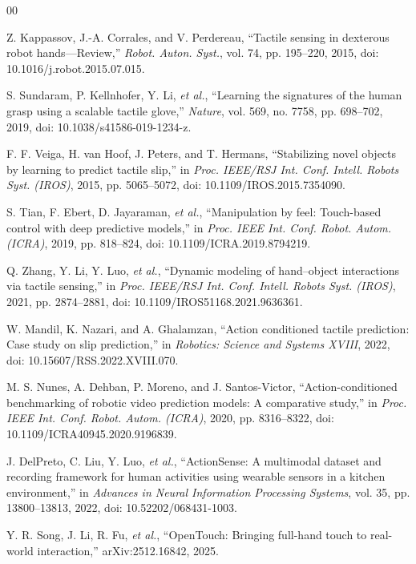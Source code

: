 \documentclass[letterpaper, 10 pt, conference]{ieeeconf}
\begin{document}
\begin{thebibliography}{00}

Z. Kappassov, J.-A. Corrales, and V. Perdereau, ``Tactile sensing in dexterous robot hands---Review,'' \emph{Robot. Auton. Syst.}, vol. 74, pp. 195--220, 2015, doi: 10.1016/j.robot.2015.07.015.

S. Sundaram, P. Kellnhofer, Y. Li, \emph{et al.}, ``Learning the signatures of the human grasp using a scalable tactile glove,'' \emph{Nature}, vol. 569, no. 7758, pp. 698--702, 2019, doi: 10.1038/s41586-019-1234-z.

F. F. Veiga, H. van Hoof, J. Peters, and T. Hermans, ``Stabilizing novel objects by learning to predict tactile slip,'' in \emph{Proc. IEEE/RSJ Int. Conf. Intell. Robots Syst. (IROS)}, 2015, pp. 5065--5072, doi: 10.1109/IROS.2015.7354090.

S. Tian, F. Ebert, D. Jayaraman, \emph{et al.}, ``Manipulation by feel: Touch-based control with deep predictive models,'' in \emph{Proc. IEEE Int. Conf. Robot. Autom. (ICRA)}, 2019, pp. 818--824, doi: 10.1109/ICRA.2019.8794219.

Q. Zhang, Y. Li, Y. Luo, \emph{et al.}, ``Dynamic modeling of hand--object interactions via tactile sensing,'' in \emph{Proc. IEEE/RSJ Int. Conf. Intell. Robots Syst. (IROS)}, 2021, pp. 2874--2881, doi: 10.1109/IROS51168.2021.9636361.

W. Mandil, K. Nazari, and A. Ghalamzan, ``Action conditioned tactile prediction: Case study on slip prediction,'' in \emph{Robotics: Science and Systems XVIII}, 2022, doi: 10.15607/RSS.2022.XVIII.070.

M. S. Nunes, A. Dehban, P. Moreno, and J. Santos-Victor, ``Action-conditioned benchmarking of robotic video prediction models: A comparative study,'' in \emph{Proc. IEEE Int. Conf. Robot. Autom. (ICRA)}, 2020, pp. 8316--8322, doi: 10.1109/ICRA40945.2020.9196839.

J. DelPreto, C. Liu, Y. Luo, \emph{et al.}, ``ActionSense: A multimodal dataset and recording framework for human activities using wearable sensors in a kitchen environment,'' in \emph{Advances in Neural Information Processing Systems}, vol. 35, pp. 13800--13813, 2022, doi: 10.52202/068431-1003.

Y. R. Song, J. Li, R. Fu, \emph{et al.}, ``OpenTouch: Bringing full-hand touch to real-world interaction,'' arXiv:2512.16842, 2025.


\end{thebibliography}
\end{document}
